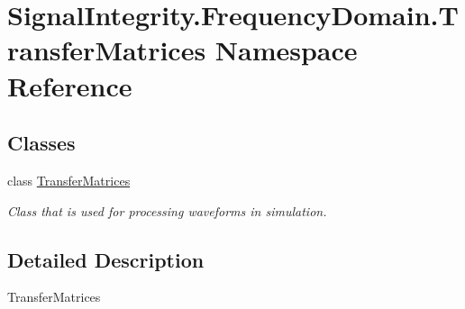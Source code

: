 \hypertarget{namespaceSignalIntegrity_1_1FrequencyDomain_1_1TransferMatrices}{}\section{Signal\+Integrity.\+Frequency\+Domain.\+Transfer\+Matrices Namespace Reference}
\label{namespaceSignalIntegrity_1_1FrequencyDomain_1_1TransferMatrices}
\subsection*{Classes}
\begin{DoxyCompactItemize}
\item 
class \hyperlink{classSignalIntegrity_1_1FrequencyDomain_1_1TransferMatrices_1_1TransferMatrices}{Transfer\+Matrices}
\begin{DoxyCompactList}\small\item\em Class that is used for processing waveforms in simulation. \end{DoxyCompactList}\end{DoxyCompactItemize}


\subsection{Detailed Description}
\begin{DoxyVerb}TransferMatrices\end{DoxyVerb}
 